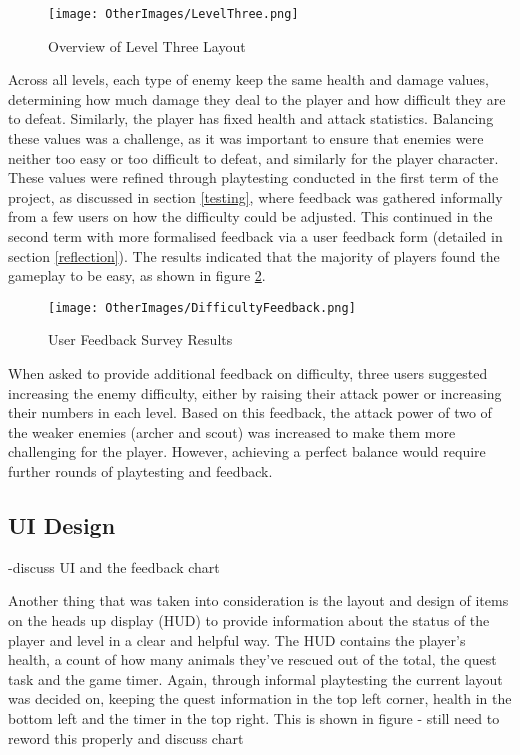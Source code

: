 \documentclass[]{final_report}
\begin{document}
\begin{figure}[H]
    \centering
    \texttt{[image: OtherImages/LevelThree.png]}
    \caption{Overview of Level Three Layout}
    \label{fig:label_LevelThree}
\end{figure}




Across all levels, each type of enemy keep the same health and damage values, determining how much damage they deal to the player and how difficult they are to defeat. Similarly, the player has fixed health and attack statistics. Balancing these values was a challenge, as it was important to ensure that enemies were neither too easy or too difficult to defeat, and similarly for the player character. These values were refined through playtesting conducted in the first term of the project, as discussed in section \ref{testing}, where feedback was gathered informally from a few users on how the difficulty could be adjusted. This continued in the second term with more formalised feedback via a user feedback form (detailed in section \ref{reflection}). The results indicated that the majority of players found the gameplay to be easy, as shown in figure \ref{fig:label_difficultyfeedback}.

\begin{figure}[H]
    \centering
    \texttt{[image: OtherImages/DifficultyFeedback.png]}
    \caption{User Feedback Survey Results}
    \label{fig:label_difficultyfeedback}
\end{figure}

When asked to provide additional feedback on difficulty, three users suggested increasing the enemy difficulty, either by raising their attack power or increasing their numbers in each level. Based on this feedback, the attack power of two of the weaker enemies (archer and scout) was increased to make them more challenging for the player. However, achieving a perfect balance would require further rounds of playtesting and feedback.


\subsection{UI Design}

-discuss UI and the feedback chart \newline

Another thing that was taken into consideration is the layout and design of items on the heads up display (HUD) to provide information about the status of the player and level in a clear and helpful way. The HUD contains the player's health, a count of how many animals they've rescued out of the total, the quest task and the game timer. Again, through informal playtesting the current layout was decided on, keeping the quest information in the top left corner, health in the bottom left and the timer in the top right. This is shown in figure \newline
- still need to reword this properly and discuss chart
\end{document}
